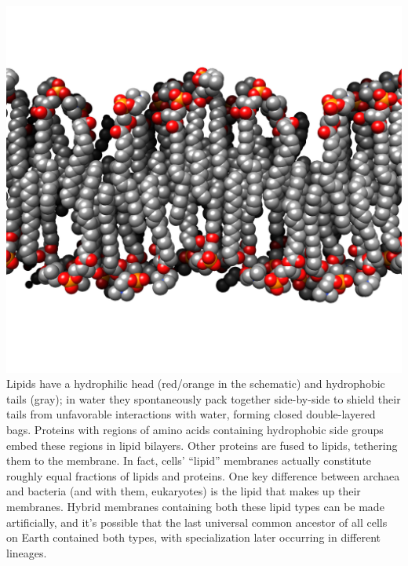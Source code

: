 \documentclass[]{book}
\begin{document}
\includegraphics{img/02_schematic/2_1_1_LipidBilayer.png} Lipids have a
hydrophilic head (red/orange in the schematic) and hydrophobic tails
(gray); in water they spontaneously pack together side-by-side to shield
their tails from unfavorable interactions with water, forming closed
double-layered bags. Proteins with regions of amino acids containing
hydrophobic side groups embed these regions in lipid bilayers. Other
proteins are fused to lipids, tethering them to the membrane. In fact,
cells' ``lipid'' membranes actually constitute roughly equal fractions
of lipids and proteins. One key difference between archaea and bacteria
(and with them, eukaryotes) is the lipid that makes up their membranes.
Hybrid membranes containing both these lipid types can be made
artificially, and it's possible that the last universal common ancestor
of all cells on Earth contained both types, with specialization later
occurring in different lineages.
\end{document}
